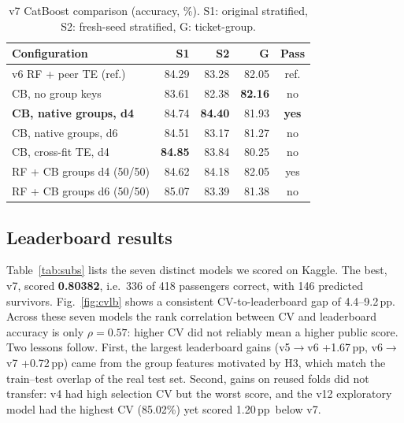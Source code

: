 \documentclass[10pt,twocolumn,letterpaper]{article}
\newcommand{\pp}{\,pp}
\begin{document}
\begin{table}[t]
\centering\small
\caption{v7 CatBoost comparison (accuracy, \%). S1: original stratified, S2: fresh-seed stratified, G: ticket-group.}
\label{tab:cat}
\begin{tabular}{lrrrc}
\toprule
Configuration & S1 & S2 & G & Pass\\
\midrule
v6 RF + peer TE (ref.) & 84.29 & 83.28 & 82.05 & ref.\\
CB, no group keys & 83.61 & 82.38 & \textbf{82.16} & no\\
\rowcolor{blue!6}\textbf{CB, native groups, d4} & 84.74 & \textbf{84.40} & 81.93 & \textbf{yes}\\
CB, native groups, d6 & 84.51 & 83.17 & 81.27 & no\\
CB, cross-fit TE, d4 & \textbf{84.85} & 83.84 & 80.25 & no\\
RF + CB groups d4 (50/50) & 84.62 & 84.18 & 82.05 & yes\\
RF + CB groups d6 (50/50) & 85.07 & 83.39 & 81.38 & no\\
\bottomrule
\end{tabular}
\end{table}

\subsection{Leaderboard results}
Table~\ref{tab:subs} lists the seven distinct models we scored on Kaggle. The best, v7, scored \textbf{0.80382}, i.e.\ 336 of 418 passengers correct, with 146 predicted survivors. Fig.~\ref{fig:cvlb} shows a consistent CV-to-leaderboard gap of 4.4--9.2\pp. Across these seven models the rank correlation between CV and leaderboard accuracy is only $\rho=0.57$: higher CV did not reliably mean a higher public score. Two lessons follow. First, the largest leaderboard gains (v5$\to$v6 +1.67\pp, v6$\to$v7 +0.72\pp) came from the group features motivated by H3, which match the train--test overlap of the real test set. Second, gains on reused folds did not transfer: v4 had high selection CV but the worst score, and the v12 exploratory model had the highest CV (85.02\%) yet scored 1.20\pp\ below v7.
\end{document}
